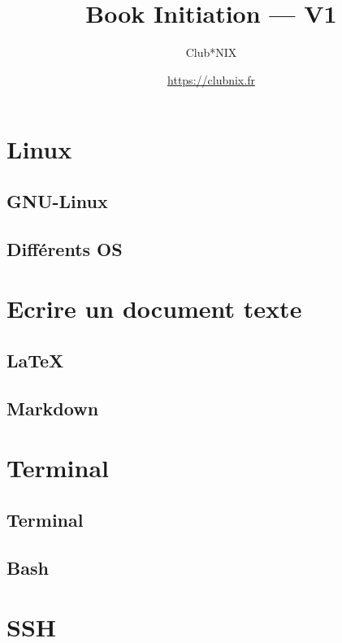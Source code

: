 \documentclass[a4paper, 12pt, titlepage]{article}
\begin{document}
\title{Book Initiation --- V1}
\author{Club*NIX}

\date{\url{https://clubnix.fr}}%

\maketitle

\tableofcontents

\newpage

\section{Linux}
 \subsection{GNU-Linux}
    
 \subsection{Différents OS}
    

\newpage
\section{Ecrire un document texte}
  \subsection{LaTeX}
    
  \subsection{Markdown}
    

\newpage
\section{Terminal}
  \subsection{Terminal}
    
  \subsection{Bash}
    
  \section{SSH}
    
\end{document}
